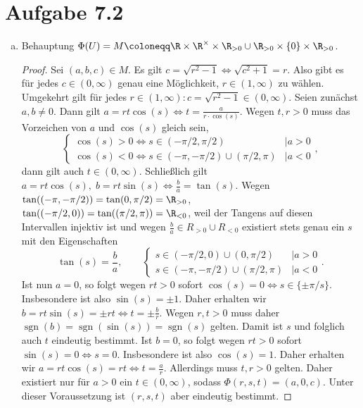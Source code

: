 \documentclass{article}
\begin{document}
    \section*{Aufgabe 7.2}
    \begin{enumerate}[(a)]
        \item Behauptung $\Phi(U) = M\coloneqq \R \times \R^\times \times \R_{> 0} \cup \R_{> 0} \times \{0\}\times \R_{> 0}$.
        \begin{proof}
            Sei $(a,b,c) \in M$.
            Es gilt $c = \sqrt{r^2 - 1} \Leftrightarrow \sqrt{c^2 + 1} = r$. Also gibt es für jedes $c \in (0,\infty)$ genau eine Möglichkeit, $r \in (1, \infty)$ zu wählen. Umgekehrt gilt für jedes $r\in (1,\infty)\colon c = \sqrt{r^2 - 1}\in (0, \infty)$.
            Seien zunächst $a, b \neq 0$. 
            Dann gilt $a = rt \cos(s) \Leftrightarrow t = \frac{a}{r \cdot \cos(s)}$. Wegen $t, r > 0$ muss das Vorzeichen von $a$ und $\cos(s)$ gleich sein,
            \[
                \begin{cases}
                    \cos(s) > 0 \Leftrightarrow s \in (-\pi/2, \pi/2)  &| a > 0\\
                    \cos(s) < 0 \Leftrightarrow s \in (-\pi,-\pi/2) \cup (\pi/2, \pi) &| a < 0
                \end{cases},
            \] dann gilt auch $t \in (0,\infty)$. 
            Schließlich gilt $a = rt \cos(s),\; b = rt \sin(s) \Leftrightarrow \frac{b}{a} = \tan(s)$.
            Wegen $\tan((-\pi, -\pi/2)) = \tan(0, \pi/2) = \R_{> 0}$, $\tan((-\pi/2, 0)) = \tan((\pi/2, \pi)) = \R_{<0}$, weil der Tangens auf diesen Intervallen injektiv ist und wegen $\frac{b}{a} \in R_{>0} \cup R_{<0}$ existiert stets genau ein $s$ mit den Eigenschaften
            \[
                \tan(s) = \frac{b}{a}, \qquad
                \begin{cases}
                    s \in (-\pi/2, 0) \cup (0, \pi/2)  &| a > 0\\
                    s \in (-\pi,-\pi/2) \cup (\pi/2, \pi) &| a < 0
                \end{cases}.
            \]
            Ist nun $a = 0$, so folgt wegen $rt > 0$ sofort $\cos(s) = 0 \Leftrightarrow s \in \{\pm \pi/s\}$. Insbesondere ist also $\sin(s) = \pm 1$. Daher erhalten wir $b = rt \sin(s) = \pm rt \Leftrightarrow t = \pm \frac{b}{r}$. Wegen $r, t > 0$ muss daher $\operatorname{sgn}(b) = \operatorname{sgn}(\sin(s)) = \operatorname{sgn}(s)$ gelten. Damit ist $s$ und folglich auch $t$ eindeutig bestimmt.
            Ist $b = 0$, so folgt wegen $rt > 0$ sofort $\sin(s) = 0 \Leftrightarrow s = 0$. Insbesondere ist also $\cos(s) = 1$. Daher erhalten wir $a = rt \cos(s) = rt \Leftrightarrow t = \frac{a}{r}$. Allerdings muss $t, r > 0$ gelten. Daher existiert nur für $a > 0$ ein $t\in (0,\infty)$, sodass $\Phi(r,s,t) = (a, 0, c)$. Unter dieser Voraussetzung ist $(r,s,t)$ aber eindeutig bestimmt.

\end{proof}
\end{enumerate}
\end{document}
